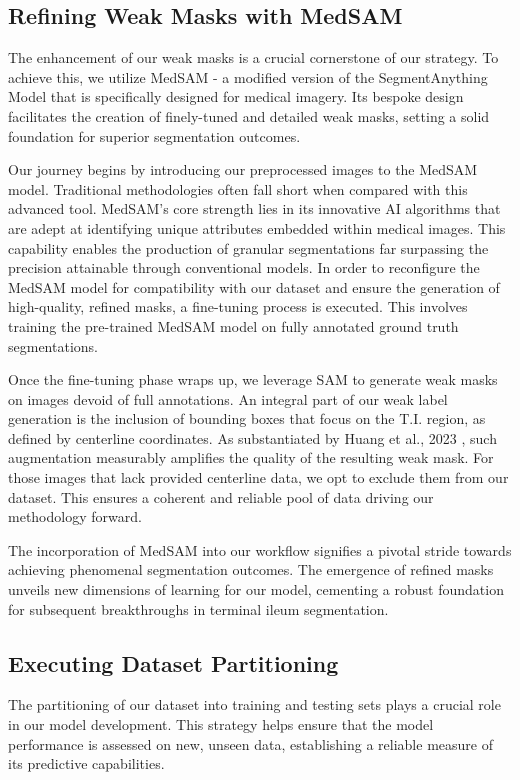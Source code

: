 \subsection{Refining Weak Masks with MedSAM}

The enhancement of our weak masks is a crucial cornerstone of our strategy. To achieve this, we utilize MedSAM - a modified version of the SegmentAnything Model that is specifically designed for medical imagery. Its bespoke design facilitates the creation of finely-tuned and detailed weak masks, setting a solid foundation for superior segmentation outcomes.

Our journey begins by introducing our preprocessed images to the MedSAM model. Traditional methodologies often fall short when compared with this advanced tool. MedSAM's core strength lies in its innovative AI algorithms that are adept at identifying unique attributes embedded within medical images. This capability enables the production of granular segmentations far surpassing the precision attainable through conventional models. In order to reconfigure the MedSAM model for compatibility with our dataset and ensure the generation of high-quality, refined masks, a fine-tuning process is executed. This involves training the pre-trained MedSAM model on fully annotated ground truth segmentations.

Once the fine-tuning phase wraps up, we leverage SAM to generate weak masks on images devoid of full annotations. An integral part of our weak label generation is the inclusion of bounding boxes that focus on the T.I. region, as defined by centerline coordinates. As substantiated by Huang et al., 2023 \cite{huang2023segment}, such augmentation measurably amplifies the quality of the resulting weak mask. For those images that lack provided centerline data, we opt to exclude them from our dataset. This ensures a coherent and reliable pool of data driving our methodology forward.

The incorporation of MedSAM into our workflow signifies a pivotal stride towards achieving phenomenal segmentation outcomes. The emergence of refined masks unveils new dimensions of learning for our model, cementing a robust foundation for subsequent breakthroughs in terminal ileum segmentation.

\subsection{Executing Dataset Partitioning}

The partitioning of our dataset into training and testing sets plays a crucial role in our model development. This strategy helps ensure that the model performance is assessed on new, unseen data, establishing a reliable measure of its predictive capabilities.

